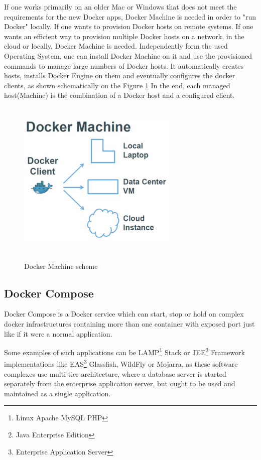 If one works primarily on an older Mac or Windows that
does not meet the requirements for the new Docker apps,
Docker Machine is needed in order to "run Docker" locally.
If one wants to provision Docker hosts on remote systems.
If one wants an efficient way to provision multiple Docker hosts on a network,
in the cloud or locally, Docker Machine is needed.
Independently form the used Operating System, one can install
Docker Machine on it and use the provisioned commands to manage
large numbers of Docker hosts. It automatically creates hosts,
installs Docker Engine on them and eventually
configures the docker clients, as shown schematically on the
Figure \ref{fig:DockerMachinePic} In the end, each managed
host(Machine) is the combination of a Docker host and a configured client.

\begin{figure}
\includegraphics[height=3in, width=3in]{DockerMachine}
\caption{Docker Machine scheme}
\cite{DockerMachinePic}
\label{fig:DockerMachinePic}
\end{figure}

\subsection{Docker Compose}

Docker Compose is a Docker service which can start,
stop or hold on complex docker infrastructures
containing more than one container with exposed port
just like if it were a normal application.\cite{DockerCompose}

Some examples of such applications
can be LAMP\footnote{Linux Apache MySQL PHP} Stack
or JEE\footnote{Java Enterprise Edition} Framework
implementations like EAS\footnote{Enterprise Application Server}
Glassfish, WildFly or Mojarra, as these software
complexes use multi-tier architecture, where a database server is
started separately from the enterprise application server,
but ought to be used and maintained as a single application.

